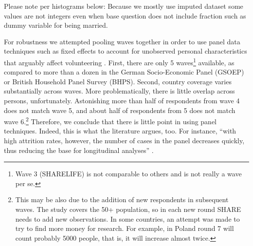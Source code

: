 \documentclass[10pt, letterpaper]{article}
\begin{document}
\begin{spacing}{1.4}
\begin{spacing}{.9}
Please note per histograms below: Because we mostly use imputed dataset some values are not integers even when base
question does not include fraction such as dummy variable for being married. 








For robustness we attempted pooling waves together in order to use panel data
techniques such as fixed effects to account for unobserved personal
characteristics that arguably affect volunteering \citep{meier08}. 
First, there are only 5 waves\footnote{Wave 3 (SHARELIFE) is not comparable to others and
is not really a wave per se.} available, as compared to more than a
dozen in the German Socio-Economic Panel (GSOEP) or British Household Panel
Survey (BHPS). Second, country coverage varies substantially across waves.
 More problematically, there is little overlap across persons, unfortunately.
Astonishing more than half of respondents from wave 4 does not match wave 5, and
about half of respondents from 5 does not match wave 6.\footnote{%
This may be also due
  to the addition of new respondents in subsequent waves. The study covers the 50+ population,
  so in each new round SHARE needs to add new observations. In some
  countries, an attempt was made to try to find more money for research. For
  example, in Poland round 7 will count probably 5000 people, that is, it will
  increase almost twice.}  Therefore, we conclude
that there is little point in using panel techniques.
%
Indeed, this is what the literature argues, too. For instance, ``with 
high attrition rates, however, the number of cases  in the panel decreases quickly, 
thus  reducing  the  base  for  longitudinal  analyses'' \citep{blom2011sample}. 


\end{spacing}
\end{spacing}
\end{document}
